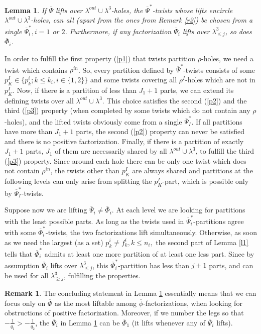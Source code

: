 \documentclass{amsart}
\newtheorem{lem}[thm]{Lemma}
\theoremstyle{definition}
\newtheorem{remark}[thm]{Remark}
\begin{document}
\begin{lem}\label{l3}
If $\overline\Psi$ lifts over $\lambda^{out}\cup\lambda^3$-holes, the $\overline\Psi^*$-twists whose lifts encircle $\lambda^{out}\cup\lambda^3$-holes, can all (apart from the ones from Remark \ref{r2}) be chosen from a single $\overline\Psi_i^*, i=1$ or $2$. Furthermore, if any factorization $\overline\Psi_i$ lifts over $\lambda_{\leq j}^3$, so does $\overline\Phi_i$.
\end{lem}

\proof
In order to fulfill the first property (\ref{p1}) that twists partition $\rho$-holes, we need a twist which contains $\rho^{in}$. So, every partition defined by $\overline\Psi^*$-twists consists of some $p_K^I\in\{p_k^i;k\leq k_i,i\in\{1,2\}\}$ and some twists covering all $\rho^I$-holes which are not in $p_K^I$. Now, if there is a partition of less than $J_1+1$ parts, we can extend its defining twists over all $\lambda^{out}\cup\lambda^3$. This choice satisfies the second (\ref{p2}) and the third (\ref{p3}) property (when completed by some twists which do not contain any $\rho$-holes), and the lifted twists obviously come from a single $\overline\Psi_I^*$. If all partitions have more than $J_1+1$ parts, the second (\ref{p2}) property can never be satisfied and there is no positive factorization. Finally, if there is a partition of exactly $J_1+1$ parts, $J_1$ of them are necessarily shared by all $\lambda^{out}\cup\lambda^3$, to fulfill the third (\ref{p3}) property. Since around each hole there can be only one twist which does not contain $\rho^{in}$, the twists other than $p_K^I$ are always shared and partitions at the following levels can only arise from splitting the $p_K^I$-part, which is possible only by $\overline\Psi_I^*$-twists.

Suppose now we are lifting $\overline\Psi_i\neq\overline\Phi_i$. At each level we are looking for partitions with the least possible parts. As long as the twists used in $\overline\Psi_i^*$-partitions agree with some $\overline\Phi_i^*$-twists, the two factorizations lift simultaneously. Otherwise, as soon as we need the largest (as a set) $p_k^i\neq f_k^i, k\leq n_i,$ the second part of Lemma \ref{l1} tells that $\overline\Phi_i^*$ admits at least one more partition of at least one less part. Since by assumption $\overline\Psi_i$ lifts over $\lambda_{\leq j}^3$, this $\overline\Phi_i^*$-partition has less than $j+1$ parts, and can be used for all $\lambda_{\geq j}^3$, fulfilling the properties.
\endproof

\begin{remark}\label{r3}
The concluding statement in Lemma \ref{l3} essentially means that we can focus only on $\overline\Phi$ as the most liftable among $\overline\phi$-factorizations, when looking for obstructions of positive factorization. Moreover, if we number the legs so that $-\frac{1}{q_1}>-\frac{1}{q_2}$, the $\overline\Psi_i$ in Lemma \ref{l3} can be $\overline\Phi_1$ (it lifts whenever any of $\overline\Psi_i$ lifts).
\end{remark}
\end{document}
